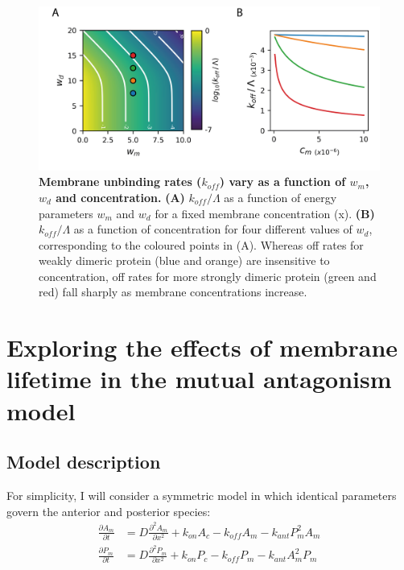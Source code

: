 \documentclass[12pt]{"report"}
\newcommand{\mycaption}[2]{\caption[#1]{\textbf{#1.} #2}}
\begin{document}
\begin{figure}
\includegraphics[scale=1]{thermodynamic_model_koff}
\centering
\mycaption{Membrane unbinding rates ($k_{off}$) vary as a function of $w_m$, $w_d$ and concentration}{
\textbf{(A)} $k_{off} / \Lambda$ as a function of energy parameters $w_m$ and $w_d$ for a fixed membrane concentration (x).
\textbf{(B)} $k_{off} / \Lambda$ as a function of concentration for four different values of $w_d$, corresponding to the coloured points in (A). Whereas off rates for weakly dimeric protein (blue and orange) are insensitive to concentration, off rates for more strongly dimeric protein (green and red) fall sharply as membrane concentrations increase.
}
\label{fig:thermodynamic_model_koff}
\end{figure}


\clearpage
\section{Exploring the effects of membrane lifetime in the mutual antagonism model}

\subsection{Model description}

For simplicity, I will consider a symmetric model in which identical parameters govern the anterior and posterior species:
\begin{align}
\frac{\partial A_m}{\partial t} &= D \frac{\partial^2 A_m}{\partial x^2} + k_{on} A_c - k_{off} A_m - k_{ant} P_m^2 A_m\\
\frac{\partial P_m}{\partial t} &= D \frac{\partial^2 P_m}{\partial x^2} + k_{on} P_c - k_{off} P_m - k_{ant} A_m^2 P_m
\end{align}
\end{document}

